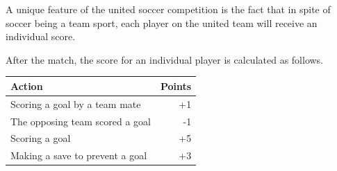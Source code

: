 \documentclass[12pt]{hurocup}
\begin{document}

\begin{lawlist}[US]

\item A unique feature of the united soccer competition is the fact
  that in spite of soccer being a team sport, each player on the
  united team will receive an individual score.

\item After the match, the score for an individual player is
  calculated as follows. 

  \begin{center}
    \begin{tabular}{|l|r|}
      \hline
      Action & Points \\
      \hline
      Scoring a goal by a team mate   & +1\\
      The opposing team scored a goal & -1\\
      Scoring a goal                  & +5\\
      Making a save to prevent a goal & +3\\
      \hline
    \end{tabular}
  \end{center}

\end{lawlist}

\end{document}
